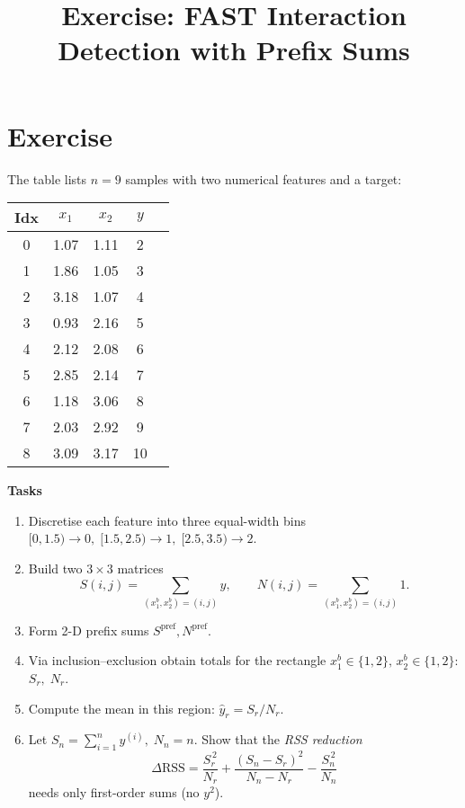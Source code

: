 \documentclass{article}
\title{Exercise: FAST Interaction Detection with Prefix Sums}
\date{}
\begin{document}
\maketitle

\section*{Exercise}
The table lists \(n=9\) samples with two numerical features and a target:

\begin{center}
\begin{tabular}{ccccc}
\toprule
Idx & $x_1$ & $x_2$ & $y$ \\ \midrule
0 & 1.07 & 1.11 &  2 \\
1 & 1.86 & 1.05 &  3\\
2 & 3.18 & 1.07 &  4 \\
3 & 0.93 & 2.16 &  5 \\
4 & 2.12 & 2.08 &  6 \\
5 & 2.85 & 2.14 &  7 \\
6 & 1.18 & 3.06 &  8 \\
7 & 2.03 & 2.92 &  9 \\
8 & 3.09 & 3.17 & 10 \\ \bottomrule
\end{tabular}

\end{center}

\bigskip
\textbf{Tasks}
\begin{enumerate}
\item Discretise each feature into three equal-width bins  
      \([0,1.5)\!\to\!0,\;[1.5,2.5)\!\to\!1,\;[2.5,3.5)\!\to\!2\).

\item Build two \(3\times3\) matrices
      \[
        S(i,j)=\!\!\sum_{(x_1^b,x_2^b)=(i,j)} \! y,
        \qquad
        N(i,j)=\!\!\sum_{(x_1^b,x_2^b)=(i,j)} \! 1 .
      \]

\item Form 2-D prefix sums
      \(S^{\mathrm{pref}},N^{\mathrm{pref}}\).

\item Via inclusion–exclusion obtain totals for the rectangle  
      \(x_1^b\!\in\!\{1,2\},\,x_2^b\!\in\!\{1,2\}\):  
      \(S_r,\;N_r\).

\item Compute the mean in this region:
      \(\hat y_r = S_r/N_r\).

\item Let \(S_n=\sum_{i=1}^n y^{(i)},\;N_n=n\).  
      Show that the \emph{RSS reduction}
      \[
        \Delta\text{RSS}
          = \frac{S_r^{\,2}}{N_r}
            +\frac{(S_n-S_r)^{2}}{N_n-N_r}
            -\frac{S_n^{\,2}}{N_n}
      \]
      needs only first-order sums (no \(y^2\)).
\end{enumerate}
\end{document}
